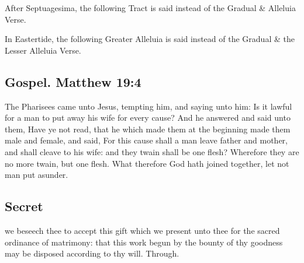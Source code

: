 
\begin{rubric}
    After Septuagesima, the following Tract is said instead of the Gradual \& Alleluia Verse.
\end{rubric}


\begin{rubric}
    In Eastertide, the following Greater Alleluia is said instead of the Gradual \& the Lesser Alleluia Verse.
\end{rubric}


\subsection{Gospel. {\normalfont Matthew 19:4}}
 The Pharisees came unto Jesus, tempting him, and saying unto him: Is it lawful for a man to put away his wife for every cause? And he answered and said unto them, Have ye not read, that he which made them at the beginning made them male and female, and said, For this cause shall a man leave father and mother, and shall cleave to his wife: and they twain shall be one flesh? Wherefore they are no more twain, but one flesh. What therefore God hath joined together, let not man put asunder.


\subsection{Secret}
 we beseech thee to accept this gift which we present unto thee for the sacred ordinance of matrimony: that this work begun by the bounty of thy goodness may be disposed according to thy will. Through.

